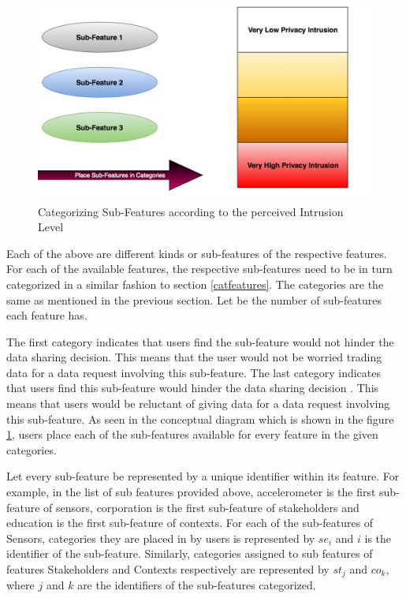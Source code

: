 \begin{figure}[ht!]
\centering
\includegraphics[width=\textwidth,keepaspectratio]{./images/categorize_sub}
\caption{Categorizing Sub-Features according to the perceived Intrusion Level \label{categorize_sub}}
\end{figure}

Each of the above are different kinds or sub-features of the respective features. 
For each of the available features, the respective sub-features need to be in turn categorized in a similar fashion to section \ref{catfeatures}.
The categories are the same as mentioned in the previous section. Let \numsubfeatures be the number of sub-features each feature has.


The first category indicates that users find the sub-feature would not hinder the data sharing decision. This means that the user would not be worried trading data for a data request involving this sub-feature. The last category indicates that users find this sub-feature would hinder the data sharing decision . This means that users would be reluctant of giving data for a data request involving this sub-feature. As seen in the conceptual diagram which is shown in the figure \ref{categorize_sub}, users place each of the sub-features available for every feature in the given categories.

Let every sub-feature be represented by a unique identifier within its feature. For example, in the list of sub features provided above, accelerometer is the first sub-feature of sensors, corporation is the first sub-feature of stakeholders and education is the first sub-feature of contexts. For each of the sub-features of Sensors, categories they are placed in by users is represented by $se_{i}$ and $i$ is the identifier
of the sub-feature. Similarly, categories assigned to sub features of features Stakeholders and Contexts respectively are represented by $st_{j}$ and $co_{k}$, where $j$ and $k$ are the identifiers of the sub-features categorized.

